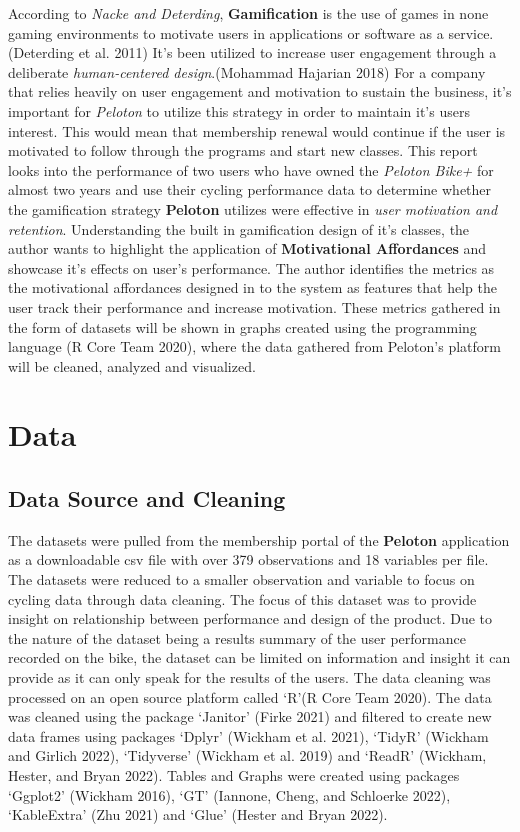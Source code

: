 \documentclass[
]{article}
\begin{document}
According to \emph{Nacke and Deterding}, \textbf{Gamification} is the use of games in none gaming environments to motivate users in applications or software as a service.(Deterding et al. 2011) It's been utilized to increase user engagement through a deliberate \emph{human-centered design}.(Mohammad Hajarian 2018) For a company that relies heavily on user engagement and motivation to sustain the business, it's important for \emph{Peloton} to utilize this strategy in order to maintain it's users interest. This would mean that membership renewal would continue if the user is motivated to follow through the programs and start new classes. This report looks into the performance of two users who have owned the \emph{Peloton Bike+} for almost two years and use their cycling performance data to determine whether the gamification strategy \textbf{Peloton} utilizes were effective in \emph{user motivation and retention}. Understanding the built in gamification design of it's classes, the author wants to highlight the application of \textbf{Motivational Affordances} and showcase it's effects on user's performance. The author identifies the metrics as the motivational affordances designed in to the system as features that help the user track their performance and increase motivation. These metrics gathered in the form of datasets will be shown in graphs created using the programming language (R Core Team 2020), where the data gathered from Peloton's platform will be cleaned, analyzed and visualized.

\hypertarget{data}{%
\section{Data}\label{data}}

\hypertarget{data-source-and-cleaning}{%
\subsection{Data Source and Cleaning}\label{data-source-and-cleaning}}

The datasets were pulled from the membership portal of the \textbf{Peloton} application as a downloadable csv file with over 379 observations and 18 variables per file. The datasets were reduced to a smaller observation and variable to focus on cycling data through data cleaning. The focus of this dataset was to provide insight on relationship between performance and design of the product. Due to the nature of the dataset being a results summary of the user performance recorded on the bike, the dataset can be limited on information and insight it can provide as it can only speak for the results of the users. The data cleaning was processed on an open source platform called `R'(R Core Team 2020). The data was cleaned using the package `Janitor' (Firke 2021) and filtered to create new data frames using packages `Dplyr' (Wickham et al. 2021), `TidyR' (Wickham and Girlich 2022), `Tidyverse' (Wickham et al. 2019) and `ReadR' (Wickham, Hester, and Bryan 2022). Tables and Graphs were created using packages `Ggplot2' (Wickham 2016), `GT' (Iannone, Cheng, and Schloerke 2022), `KableExtra' (Zhu 2021) and `Glue' (Hester and Bryan 2022).
\end{document}
